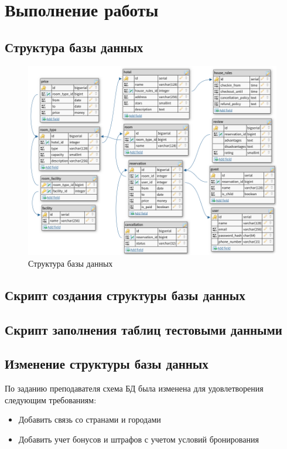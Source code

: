 \section{Выполнение работы}

\subsection{Структура базы данных}

\begin{figure}[H]
	\centering
	\includegraphics[width=\linewidth]{../../lab1/pics/scheme}
	\caption{Структура базы данных}
\end{figure}

\subsection{Скрипт создания структуры базы данных}



\subsection{Скрипт заполнения таблиц тестовыми данными}



\subsection{Изменение структуры базы данных}

По заданию преподавателя схема БД была изменена для удовлетворения следующим требованиям:
\begin{itemize}
	\item Добавить связь со странами и городами
	\item Добавить учет бонусов и штрафов с учетом условий бронирования
\end{itemize}

